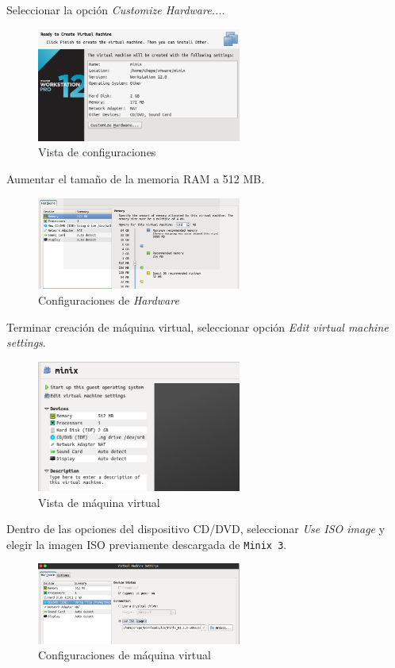 \documentclass[12pt]{article}
\begin{document}
Seleccionar la opción \textit{Customize Hardware...}.
\begin{figure}[H]
  \centering
  \includegraphics[width=0.6\textwidth]{vm/min10.png}
  \caption{Vista de configuraciones}
\end{figure}

Aumentar el tamaño de la memoria RAM a 512 MB.
\begin{figure}[H]
  \centering
  \includegraphics[width=0.6\textwidth]{vm/min11.png}
  \caption{Configuraciones de \textit{Hardware}}
\end{figure}

Terminar creación de máquina virtual, seleccionar opción \textit{Edit virtual machine settings}.
\begin{figure}[H]
  \centering
  \includegraphics[width=0.6\textwidth]{vm/min13.png}
  \caption{Vista de máquina virtual}
\end{figure}

Dentro de las opciones del dispositivo CD/DVD, seleccionar \textit{Use ISO image} y elegir la imagen ISO previamente descargada de \texttt{Minix 3}.
\begin{figure}[H]
  \centering
  \includegraphics[width=0.6\textwidth]{vm/min14.png}
  \caption{Configuraciones de máquina virtual}
\end{figure}
\end{document}
